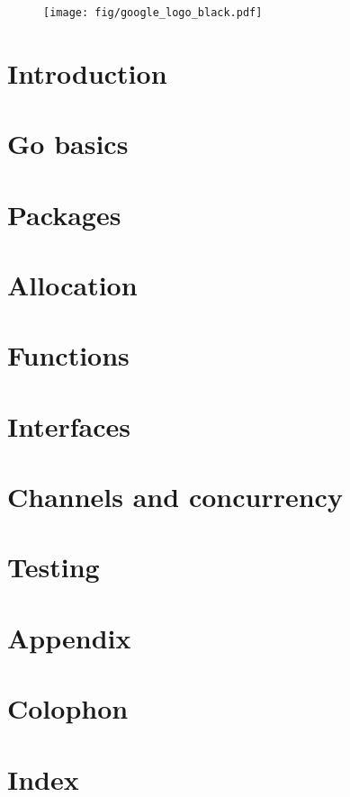 \documentclass[a4paper,twoside]{blocksbook}
\begin{document}

\newpage
{}
\tableofcontents
\lstlistoflistings  %
\listoffigures
\listoftables
\listofex

\clearpage
\thispagestyle{empty}
\begin{figure}
\begin{center}
\texttt{[image: fig/google\_logo\_black.pdf]}
\end{center}
\end{figure}

\chapter{Introduction}
\label{chap:intro}


\chapter{Go basics}
\label{chap:basics}


\chapter{Packages}
\label{chap:packages}


\chapter{Allocation}
\label{chap:allocation}


\chapter{Functions}
\label{chap:functions}


\chapter{Interfaces}
\label{chap:interfaces}


\chapter{Channels and concurrency}
\label{chap:channels}


\chapter{Testing}
\label{chap:testing}

\appendix
\chapter{Appendix}


\chapter{Colophon}


\chapter{Index}
\printindex


\end{document}
